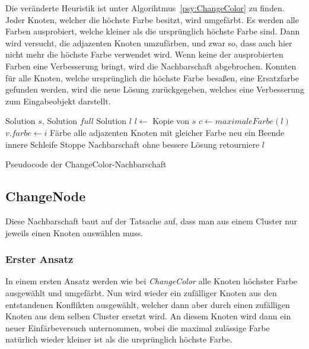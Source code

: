 Die veränderte Heuristik ist unter Algorihtmus~\ref{psy:ChangeColor} zu finden. Jeder Knoten, welcher die höchste Farbe besitzt, wird umgefärbt. Es werden alle Farben ausprobiert, welche kleiner als
die ursprünglich höchste Farbe sind. Dann wird versucht, die adjazenten Knoten umzufärben, und zwar so, dass auch hier nicht mehr die höchste Farbe verwendet wird. Wenn keine der ausprobierten Farben eine
Verbesserung bringt, wird die Nachbarschaft abgebrochen. Konnten für alle Knoten, welche ursprünglich die höchste Farbe besaßen, eine Ersatzfarbe gefunden werden, wird die neue Lösung zurückgegeben, 
welches eine Verbesserung zum Eingabeobjekt darstellt.

\begin{algorithm}
\begin{algorithmic}[1]
\Require Solution $s$, Solution $full$
\Ensure Solution $l$
\State $l \leftarrow$ Kopie von $s$
\State $c \leftarrow maximaleFarbe(l)$
\State $v.farbe \leftarrow i$
\State Färbe alle adjazenten Knoten mit gleicher Farbe neu ein
\State Beende innere Schleife  
\EndIf
\EndFor
{}
\State Stoppe Nachbarschaft ohne bessere Lösung
\EndIf
\EndFor
\State retourniere $l$
\end{algorithmic}
\caption{Pseudocode der ChangeColor-Nachbarschaft}
\label{psy:ChangeColor}
\end{algorithm}

\subsection{ChangeNode}
\label{sec:changenode}
Diese Nachbarschaft baut auf der Tatsache auf, dass man aus einem Cluster nur jeweils einen Knoten auswählen muss. 

\subsubsection{Erster Ansatz}

In einem ersten Ansatz werden wie bei \emph{ChangeColor} alle Knoten höchster Farbe ausgewählt und umgefärbt.
Nun wird wieder ein zufälliger Knoten aus den entstandenen Konflikten ausgewählt, welcher dann aber durch einen zufälligen Knoten aus dem selben Cluster ersetzt wird. An diesem Knoten wird dann ein neuer Einfärbeversuch unternommen, wobei die maximal zulässige Farbe natürlich wieder kleiner ist als die ursprünglich höchste Farbe.

